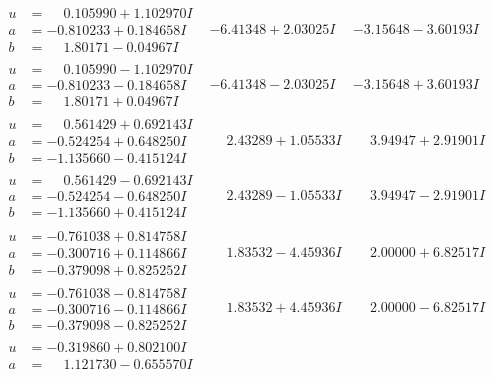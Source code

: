 \documentclass[1p]{elsarticle_modified}
\theoremstyle{definition}
\begin{document}
$$\begin{array}{c|c|c}
 \hline 
\begin{aligned}
u &= \phantom{-}0.105990 + 1.102970 I \\
a &= -0.810233 + 0.184658 I \\
b &= \phantom{-}1.80171 - 0.04967 I\end{aligned}
 & -6.41348 + 2.03025 I & -3.15648 - 3.60193 I \\ \hline\begin{aligned}
u &= \phantom{-}0.105990 - 1.102970 I \\
a &= -0.810233 - 0.184658 I \\
b &= \phantom{-}1.80171 + 0.04967 I\end{aligned}
 & -6.41348 - 2.03025 I & -3.15648 + 3.60193 I \\ \hline\begin{aligned}
u &= \phantom{-}0.561429 + 0.692143 I \\
a &= -0.524254 + 0.648250 I \\
b &= -1.135660 - 0.415124 I\end{aligned}
 & \phantom{-}2.43289 + 1.05533 I & \phantom{-}3.94947 + 2.91901 I \\ \hline\begin{aligned}
u &= \phantom{-}0.561429 - 0.692143 I \\
a &= -0.524254 - 0.648250 I \\
b &= -1.135660 + 0.415124 I\end{aligned}
 & \phantom{-}2.43289 - 1.05533 I & \phantom{-}3.94947 - 2.91901 I \\ \hline\begin{aligned}
u &= -0.761038 + 0.814758 I \\
a &= -0.300716 + 0.114866 I \\
b &= -0.379098 + 0.825252 I\end{aligned}
 & \phantom{-}1.83532 - 4.45936 I & \phantom{-}2.00000 + 6.82517 I \\ \hline\begin{aligned}
u &= -0.761038 - 0.814758 I \\
a &= -0.300716 - 0.114866 I \\
b &= -0.379098 - 0.825252 I\end{aligned}
 & \phantom{-}1.83532 + 4.45936 I & \phantom{-}2.00000 - 6.82517 I \\ \hline\begin{aligned}
u &= -0.319860 + 0.802100 I \\
a &= \phantom{-}1.121730 - 0.655570 I \\

\end{aligned}
\end{array}$$
\end{document}
